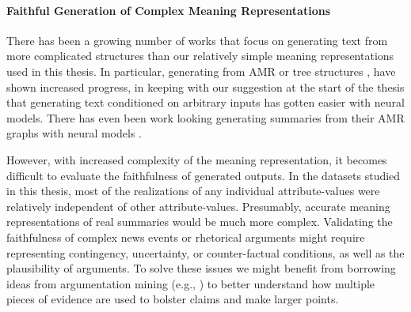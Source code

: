 \paragraph{Faithful Generation of Complex Meaning Representations} There has
been a growing number of works that focus on generating text from more
complicated structures than our relatively simple meaning representations used
in this thesis. In particular, generating from AMR
\citep{castroferreira2017,wang2020} or tree structures
\citep{balakrishnan2019}, have shown increased progress, in keeping with our
suggestion at the start of the thesis that generating text conditioned on
arbitrary inputs has gotten easier with neural models.  There has even been
work looking generating summaries from their AMR graphs with neural models
\citep{hardy2018}. 

However, with increased complexity of the meaning representation, it becomes
difficult to evaluate the faithfulness of generated outputs. In the datasets
studied in this thesis, most of the realizations of any individual
attribute-values were relatively independent of other attribute-values.
Presumably, accurate meaning representations of real summaries would be much
more complex.  Validating the faithfulness of complex news events or rhetorical
arguments might require representing contingency, uncertainty, or
counter-factual conditions, as well as the plausibility of arguments. To solve
these issues we might benefit from borrowing ideas from argumentation mining
(e.g., \cite{chakrabarty2019}) to better understand how multiple pieces of
evidence are used to bolster claims and make larger points.
